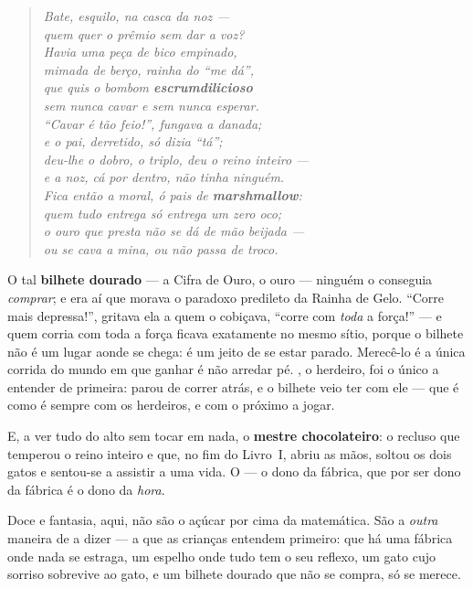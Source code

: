 \documentclass[livro.tex]{subfiles}
\begin{document}
\begin{verse}\itshape\small
Bate, esquilo, na casca da noz ---\\
quem quer o prêmio sem dar a voz?\\[3pt]
Havia uma peça de bico empinado,\\
mimada de berço, rainha do ``me dá'',\\
que quis o bombom \textbf{escrumdilicioso}\\
sem nunca cavar e sem nunca esperar.\\[3pt]
``Cavar é tão feio!'', fungava a danada;\\
e o pai, derretido, só dizia ``tá'';\\
deu-lhe o dobro, o triplo, deu o reino inteiro ---\\
e a noz, cá por dentro, não tinha ninguém.\\[3pt]
Fica então a moral, ó pais de \textbf{marshmallow}:\\
quem tudo entrega só entrega um zero oco;\\
o ouro que presta não se dá de mão beijada ---\\
ou se cava a mina, ou não passa de troco.
\end{verse}

\medskip

O tal \textbf{bilhete dourado} --- a Cifra de Ouro, o ouro --- ninguém o conseguia
\emph{comprar}; e era aí que morava o paradoxo predileto da Rainha de Gelo. ``Corre
mais depressa!'', gritava ela a quem o cobiçava, ``corre com \emph{toda} a força!'' ---
e quem corria com toda a força ficava exatamente no mesmo sítio, porque o bilhete não é
um lugar aonde se chega: é um jeito de se estar parado. Merecê-lo é a única corrida do
mundo em que ganhar é não arredar pé. \Joa , o herdeiro, foi o único a entender de
primeira: parou de correr atrás, e o bilhete veio ter com ele --- que é como é sempre
com os herdeiros, e com o próximo a jogar.

E, a ver tudo do alto sem tocar em nada, o \textbf{mestre chocolateiro}: o recluso que
temperou o reino inteiro e que, no fim do Livro~I, abriu as mãos, soltou os dois gatos
e sentou-se a assistir a uma vida. O \Opr --- o dono da fábrica, que por ser dono da
fábrica é o dono da \emph{hora}.

\medskip

Doce e fantasia, aqui, não são o açúcar por cima da matemática. São a \emph{outra}
maneira de a dizer --- a que as crianças entendem primeiro: que há uma fábrica onde
nada se estraga, um espelho onde tudo tem o seu reflexo, um gato cujo sorriso
sobrevive ao gato, e um bilhete dourado que não se compra, só se merece.
\end{document}
